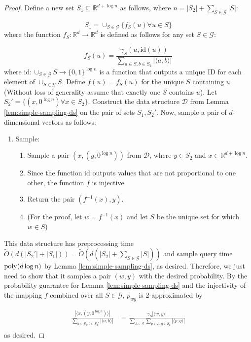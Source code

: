 \begin{proof}
Define a new set $S_1\subseteq \mathbb{R}^{d+\log n}$ as follows, where $n = |S_2| + \sum_{S\in \mathcal G} |S|$:

$$S_1 = \cup_{S\in \mathcal G} \{f_S(u) \forall u\in S\}$$
where the function $f_S:\mathbb{R}^d\rightarrow \mathbb{R}^d$ is defined as follows for any set $S\in \mathcal G$:

$$f_S(u) = \frac{\gamma_S (u,\text{id}(u))}{\sum_{a\in S,b\in S_2} |\langle a,b\rangle|}$$
where $\text{id}: \cup_{S\in \mathcal G} S\rightarrow \{0,1\}^{\log n}$ is a function that outputs a unique ID for each element of $\cup_{S\in \mathcal G} S$. Define $f(u) = f_S(u)$ for the unique $S$ containing $u$ (Without loss of generality assume that exactly one $S$ contains $u$). Let $S_2' = \{(x,0^{\log n}) \forall x\in S_2\}$. Construct the data structure $\mathcal D$ from Lemma \ref{lem:simple-sampling-ds} on the pair of sets $S_1,S_2'$. Now, sample a pair of $d$-dimensional vectors as follows:

\begin{enumerate}
    \item Sample:
    \begin{enumerate}
        \item Sample a pair $(x,(y,0^{\log n}))$ from $\mathcal D$, where $y\in S_2$ and $x\in \mathbb{R}^{d+\log n}$.
        \item Since the function $\text{id}$ outputs values that are not proportional to one other, the function $f$ is injective.
        \item Return the pair $(f^{-1}(x),y)$.
        \item (For the proof, let $w = f^{-1}(x)$ and let $S$ be the unique set for which $w\in S$)
    \end{enumerate}
\end{enumerate}

This data structure has preprocessing time $\tilde{O}(d(|S_2'| + |S_1|)) = \tilde{O}(d(|S_2| + \sum_{S\in \mathcal G} |S|))$ and sample query time $\mathrm{poly}(d\log n)$ by Lemma \ref{lem:simple-sampling-ds}, as desired. Therefore, we just need to show that it samples a pair $(w,y)$ with the desired probability. By the probability guarantee for Lemma \ref{lem:simple-sampling-ds} and the injectivity of the mapping $f$ combined over all $S\in \mathcal G$, $p_{wy}$ is 2-approximated by

\begin{align*}
\frac{|\langle x,(y,0^{\log n})\rangle|}{\sum_{a\in S_1,b\in S_2'} |\langle a,b\rangle|} &= \frac{\gamma_S |\langle w,y\rangle|}{\sum_{A\in \mathcal G} \sum_{p\in A,q\in S_2} |\langle p,q\rangle|}\\
\end{align*}
as desired.
\end{proof}


